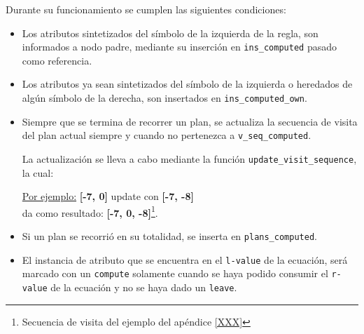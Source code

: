 Durante su funcionamiento se cumplen las siguientes condiciones:
\begin{itemize}
\item Los atributos sintetizados del símbolo de la izquierda de la regla, son informados a nodo padre, mediante su inserción en \texttt{ins\_computed} pasado como referencia.

\item Los atributos ya sean sintetizados del símbolo de la izquierda o heredados de algún símbolo de la derecha, son insertados en \texttt{ins\_computed\_own}.

\item Siempre que se termina de recorrer un plan, se actualiza la secuencia de visita del plan actual siempre y cuando no pertenezca a \texttt{v\_seq\_computed}.

La actualización se lleva a cabo mediante la función \texttt{update\_visit\_sequence}, la cual:

\underline{Por ejemplo:}\hspace*{1cm} \textbf{[-7, 0]} update con \textbf{[-7, -8]}\\
\hspace*{2.8cm} da como resultado: \textbf{[-7, 0, -8]}\footnote{Secuencia de visita del ejemplo del apéndice \ref{XXX}}.

\item Si un plan se recorrió en su totalidad, se inserta en \texttt{plans\_computed}.

\item El instancia de atributo que se encuentra en el \texttt{l-value} de la ecuación, será marcado con un \texttt{compute} solamente cuando se haya podido consumir el \texttt{r-value} de la ecuación y no se haya dado un \texttt{leave}.


\end{itemize}
